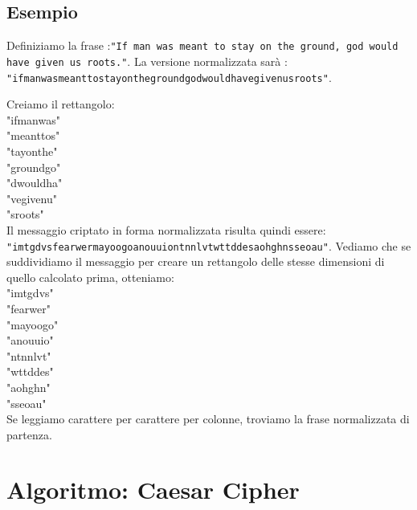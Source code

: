 \subsection{Esempio}
Definiziamo la frase :\texttt{"If man was meant to stay on the ground, god would have given us roots."}.
La versione normalizzata sarà : \texttt{"ifmanwasmeanttostayonthegroundgodwouldhavegivenusroots"}.

Creiamo il rettangolo: \\

\noindent"ifmanwas" \\
"meanttos" \\
"tayonthe" \\ 
"groundgo" \\
"dwouldha" \\
"vegivenu" \\
"sroots\;\;\;\;" \\

Il messaggio criptato in forma normalizzata risulta quindi essere: \texttt{"imtgdvsfearwermayoogoanouuiontnnlvtwttddesaohghnsseoau"}.
Vediamo che se suddividiamo il messaggio per creare un rettangolo delle stesse dimensioni di quello calcolato prima, otteniamo: \\

\noindent"imtgdvs" \\
"fearwer" \\
"mayoogo" \\
"anouuio" \\
"ntnnlvt" \\
"wttddes" \\
"aohghn\;\;" \\
"sseoau\;\;" \\

Se leggiamo carattere per carattere per colonne, troviamo la frase normalizzata di partenza.

\section{Algoritmo: Caesar Cipher}
